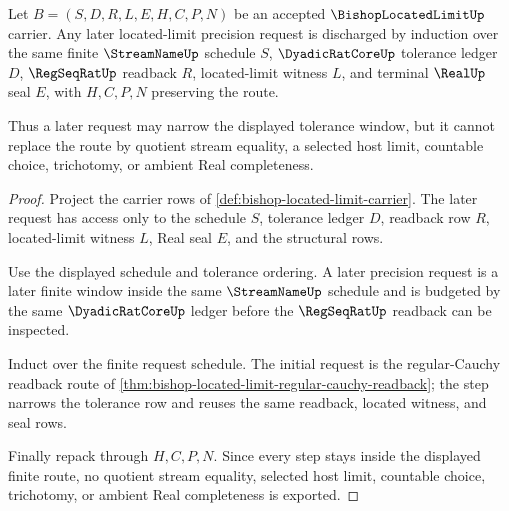 \begin{theorem}
\label{thm:bishop-located-limit-tail-modulus-induction}
Let $B=(S,D,R,L,E,H,C,P,N)$ be an accepted $\BishopLocatedLimitUp$ carrier. Any later located-limit precision request is discharged by induction over the same finite $\StreamNameUp$ schedule $S$, $\DyadicRatCoreUp$ tolerance ledger $D$, $\RegSeqRatUp$ readback $R$, located-limit witness $L$, and terminal $\RealUp$ seal $E$, with $H,C,P,N$ preserving the route.

Thus a later request may narrow the displayed tolerance window, but it cannot replace the route by quotient stream equality, a selected host limit, countable choice, trichotomy, or ambient Real completeness.
\end{theorem}
\begin{proof}
Project the carrier rows of \autoref{def:bishop-located-limit-carrier}. The later request has access only to the schedule $S$, tolerance ledger $D$, readback row $R$, located-limit witness $L$, Real seal $E$, and the structural rows.

Use the displayed schedule and tolerance ordering. A later precision request is a later finite window inside the same $\StreamNameUp$ schedule and is budgeted by the same $\DyadicRatCoreUp$ ledger before the $\RegSeqRatUp$ readback can be inspected.

Induct over the finite request schedule. The initial request is the regular-Cauchy readback route of \autoref{thm:bishop-located-limit-regular-cauchy-readback}; the step narrows the tolerance row and reuses the same readback, located witness, and seal rows.

Finally repack through $H,C,P,N$. Since every step stays inside the displayed finite route, no quotient stream equality, selected host limit, countable choice, trichotomy, or ambient Real completeness is exported.
\end{proof}

